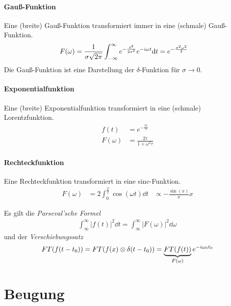 \paragraph{Gauß-Funktion} Eine (breite) Gauß-Funktion transformiert
immer in eine (schmale) Gauß-Funktion.
\begin{align*}
  F(\omega) &= \frac{1}{\sigma\sqrt{2\pi}}\int_{-\infty}^{\infty}
              e^{-\frac{t^2}{2\sigma^2}} e^{-i\omega t} \mathrm{d} t
              = e^{-\frac{\sigma^2\omega^2}{2}}
\end{align*}
Die Gauß-Funktion ist eine Darstellung der $\delta$-Funktion für
$\sigma\longrightarrow 0$.

\paragraph{Exponentialfunktion} Eine (breite) Exponentialfunktion
transformiert in eine (schmale) Lorentzfunktion.
\begin{align*}
  f(t) &= e^{-\frac{\vert t\vert}{\tau}}\\
  F(\omega) &= \frac{2\tau}{1+\omega^2\tau}
\end{align*}

\paragraph{Rechteckfunktion} Eine Rechteckfunktion transformiert in
eine sinc-Funktion.
\begin{align*}
  F(\omega) &= 2\int_{0}^{\frac{T}{2}}\cos(\omega t)\dd t
  &\propto -\frac{\sin(x)}{x} x
\end{align*}


Es gilt die \emph{Parseval'sche Formel}
\begin{gather*}
  \int_{\infty}^{\infty} |f(t)|^2 \dd t 
  = \int_{\infty}^{\infty} |F(\omega)|^2 \dd\omega
\end{gather*}
und der \emph{Verschiebungssatz}
\begin{align*}
  FT(f(t-t_0)) = FT(f(x)\otimes\delta(t-t_0))
  = \underbrace{FT(f(t))}_{F(\omega)}e^{-i\omega_0 t_0}
\end{align*}


\section{Beugung}
